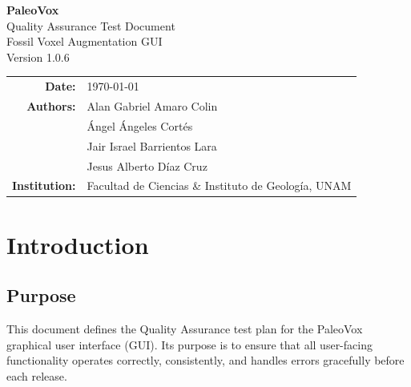 \documentclass[12pt,a4paper]{article}
\begin{document}
\begin{titlepage}
\centering
\vspace*{3cm}

{\Huge\bfseries PaleoVox}\\[0.5cm]
{\Large Quality Assurance Test Document}\\[1.5cm]

{\large Fossil Voxel Augmentation GUI}\\[0.5cm]
{\large Version 1.0.6}\\[2cm]

\begin{tabular}{rl}
\textbf{Date:} & \today \\
\textbf{Authors:} & Alan Gabriel Amaro Colin \\
                 & Ángel Ángeles Cortés \\
                 & Jair Israel Barrientos Lara \\
                 & Jesus Alberto Díaz Cruz \\
\textbf{Institution:} & Facultad de Ciencias \& Instituto de Geología, UNAM \\
\end{tabular}

\vfill
\end{titlepage}

\tableofcontents
\newpage

\section{Introduction}

\subsection{Purpose}
This document defines the Quality Assurance test plan for the PaleoVox graphical user interface (GUI). Its purpose is to ensure that all user-facing functionality operates correctly, consistently, and handles errors gracefully before each release.
\end{document}
